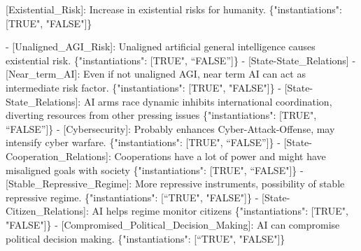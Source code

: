 \documentclass[
  11pt,
  letterpaper,
  openany]{book}
\newenvironment{Shaded}{\begin{snugshade}}{\end{snugshade}}
\newcommand{\DataTypeTok}[1]{\textcolor[rgb]{0.68,0.00,0.00}{#1}}
\newcommand{\ErrorTok}[1]{\textcolor[rgb]{0.68,0.00,0.00}{#1}}
\newcommand{\FunctionTok}[1]{\textcolor[rgb]{0.28,0.35,0.67}{#1}}
\newcommand{\OtherTok}[1]{\textcolor[rgb]{0.00,0.23,0.31}{#1}}
\newcommand{\StringTok}[1]{\textcolor[rgb]{0.13,0.47,0.30}{#1}}
\begin{document}
\begin{Shaded}
\begin{Highlighting}[]
\OtherTok{[}\ErrorTok{Existential\_Risk}\OtherTok{]}\ErrorTok{:} \ErrorTok{Increase} \ErrorTok{in} \ErrorTok{existential} \ErrorTok{risks} \ErrorTok{for} \ErrorTok{humanity.} \FunctionTok{\{}\DataTypeTok{"instantiations"}\FunctionTok{:} \OtherTok{[}\ErrorTok{TRUE}\StringTok{", "}\ErrorTok{FALSE}\StringTok{"]\}}

\StringTok{{-} [Unaligned\_AGI\_Risk]: Unaligned artificial general intelligence causes existential risk. \{"}\ErrorTok{instantiations}\StringTok{": [TRUE"}\OtherTok{,} \ErrorTok{“FALSE”}\OtherTok{]}\FunctionTok{\}}
  \ErrorTok{{-}} \OtherTok{[}\ErrorTok{State{-}State\_Relations}\OtherTok{]}
\ErrorTok{{-}} \OtherTok{[}\ErrorTok{Near\_term\_AI}\OtherTok{]}\ErrorTok{:} \ErrorTok{Even} \ErrorTok{if} \ErrorTok{not} \ErrorTok{unaligned} \ErrorTok{AGI,} \ErrorTok{near} \ErrorTok{term} \ErrorTok{AI} \ErrorTok{can} \ErrorTok{act} \ErrorTok{as} \ErrorTok{intermediate} \ErrorTok{risk} \ErrorTok{factor.} \FunctionTok{\{}\DataTypeTok{"instantiations"}\FunctionTok{:} \OtherTok{[}\ErrorTok{TRUE}\StringTok{", "}\ErrorTok{FALSE}\StringTok{"]\}}
\StringTok{  {-} [State{-}State\_Relations]: AI arms race dynamic inhibits international coordination, diverting resources from other pressing issues \{"}\ErrorTok{instantiations}\StringTok{": [TRUE"}\OtherTok{,} \ErrorTok{“FALSE”}\OtherTok{]}\FunctionTok{\}}
    \ErrorTok{{-}} \OtherTok{[}\ErrorTok{Cybersecurity}\OtherTok{]}\ErrorTok{:} \ErrorTok{Probably} \ErrorTok{enhances} \ErrorTok{Cyber{-}Attack{-}Offense,} \ErrorTok{may} \ErrorTok{intensify} \ErrorTok{cyber} \ErrorTok{warfare.} \FunctionTok{\{}\DataTypeTok{"instantiations"}\FunctionTok{:} \OtherTok{[}\ErrorTok{TRUE}\StringTok{", “FALSE”]\}}
\StringTok{  {-} [State{-}Cooperation\_Relations]: Cooperations have a lot of power and might have misaligned goals with society \{"}\ErrorTok{instantiations}\StringTok{": [TRUE"}\OtherTok{,} \ErrorTok{“FALSE}\StringTok{"]\}}
\StringTok{  {-} [Stable\_Repressive\_Regime]: More repressive instruments, possibility of stable repressive regime. \{"}\ErrorTok{instantiations}\StringTok{": [“TRUE"}\OtherTok{,} \StringTok{"FALSE"}\OtherTok{]}\FunctionTok{\}}
    \ErrorTok{{-}} \OtherTok{[}\ErrorTok{State{-}Citizen\_Relations}\OtherTok{]}\ErrorTok{:} \ErrorTok{AI} \ErrorTok{helps} \ErrorTok{regime} \ErrorTok{monitor} \ErrorTok{citizens} \FunctionTok{\{}\DataTypeTok{"instantiations"}\FunctionTok{:} \OtherTok{[}\ErrorTok{TRUE}\StringTok{", "}\ErrorTok{FALSE}\StringTok{"]\}}
\StringTok{  {-} [Compromised\_Political\_Decision\_Making]: AI can compromise political decision making. \{"}\ErrorTok{instantiations}\StringTok{": [“TRUE"}\OtherTok{,} \StringTok{"FALSE"}\OtherTok{]}\FunctionTok{\}}

\end{Highlighting}
\end{Shaded}
\end{document}
